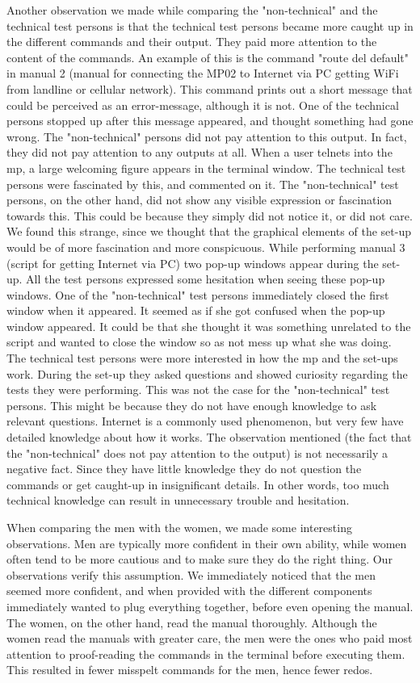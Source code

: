 Another observation we made while comparing the "non-technical" and the technical test persons is that the technical test persons became more caught up in the different commands and their output. They paid more attention to the content of the commands. An example of this is the command "route del default" in manual 2 (manual for connecting the MP02 to Internet via PC getting WiFi from landline or cellular network). This command prints out a short message that could be perceived as an error-message, although it is not. One of the technical persons stopped up after this message appeared, and thought something had gone wrong. The "non-technical" persons did not pay attention to this output. In fact, they did not pay attention to any outputs at all. When a user telnets into the \gls{mp}, a large welcoming figure appears in the terminal window. The technical test persons were fascinated by this, and commented on it. The "non-technical" test persons, on the other hand, did not show any visible expression or fascination towards this. This could be because they simply did not notice it, or did not care. We found this strange, since we thought that the graphical elements of the set-up would be of more fascination and more conspicuous. While performing manual 3 (script for getting Internet via PC) two pop-up windows appear during the set-up. All the test persons expressed some hesitation when seeing these pop-up windows. One of the "non-technical" test persons immediately closed the first window when it appeared. It seemed as if she got confused when the pop-up window appeared. It could be that she thought it was something unrelated to the script and wanted to close the window so as not mess up what she was doing. The technical test persons were more interested in how the \gls{mp} and the set-ups work. During the set-up they asked questions and showed curiosity regarding the tests they were performing. This was not the case for the "non-technical" test persons. This might be because they do not have enough knowledge to ask relevant questions. Internet is a commonly used phenomenon, but very few have detailed knowledge about how it works. The observation mentioned (the fact that the "non-technical" does not pay attention to the output) is not necessarily a negative fact. Since they have little knowledge they do not question the commands or get caught-up in insignificant details. In other words, too much technical knowledge can result in unnecessary trouble and hesitation. 

When comparing the men with the women, we made some interesting observations. Men are typically more confident in their own ability, while women often tend to be more cautious and to make sure they do the right thing. Our observations verify this assumption. We immediately noticed that the men seemed more confident, and when provided with the different components immediately wanted to plug everything together, before even opening the manual. The women, on the other hand, read the manual thoroughly. Although the women read the manuals with greater care, the men were the ones who paid most attention to proof-reading the commands in the terminal before executing them. This resulted in fewer misspelt commands for the men, hence fewer redos. 

